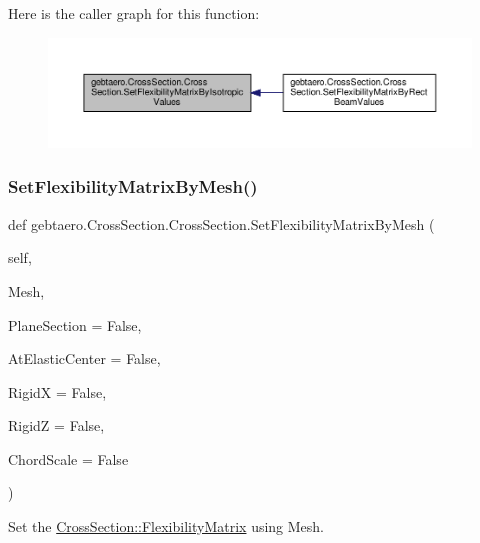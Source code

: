 Here is the caller graph for this function\+:\nopagebreak
\begin{figure}[H]
\begin{center}
\leavevmode
\includegraphics[width=350pt]{classgebtaero_1_1_cross_section_1_1_cross_section_a8e1902ba4dd5fbdb184868b55b663ebc_icgraph}
\end{center}
\end{figure}
\mbox{\label{classgebtaero_1_1_cross_section_1_1_cross_section_a70eb1851ddf4a3f88fb14cfc827e0c83}} 
\subsubsection{\texorpdfstring{Set\+Flexibility\+Matrix\+By\+Mesh()}{SetFlexibilityMatrixByMesh()}}
{\footnotesize\ttfamily def gebtaero.\+Cross\+Section.\+Cross\+Section.\+Set\+Flexibility\+Matrix\+By\+Mesh (\begin{DoxyParamCaption}\item[{}]{self,  }\item[{}]{Mesh,  }\item[{}]{Plane\+Section = {\ttfamily False},  }\item[{}]{At\+Elastic\+Center = {\ttfamily False},  }\item[{}]{RigidX = {\ttfamily False},  }\item[{}]{RigidZ = {\ttfamily False},  }\item[{}]{Chord\+Scale = {\ttfamily False} }\end{DoxyParamCaption})}



Set the \hyperlink{classgebtaero_1_1_cross_section_1_1_cross_section_ac20eafaf38ff757f9a8c9ae89212396a}{Cross\+Section\+::\+Flexibility\+Matrix} using Mesh. 


